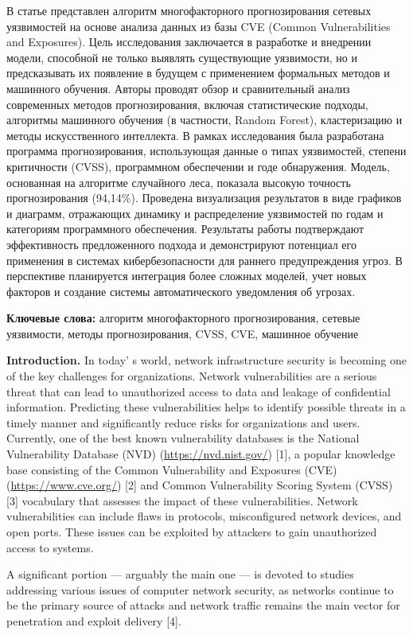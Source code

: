 В статье представлен алгоритм многофакторного прогнозирования сетевых
уязвимостей на основе анализа данных из базы CVE (Common Vulnerabilities
and Exposures). Цель исследования заключается в разработке и внедрении
модели, способной не только выявлять существующие уязвимости, но и
предсказывать их появление в будущем с применением формальных методов и
машинного обучения. Авторы проводят обзор и сравнительный анализ
современных методов прогнозирования, включая статистические подходы,
алгоритмы машинного обучения (в частности, Random Forest), кластеризацию
и методы искусственного интеллекта. В рамках исследования была
разработана программа прогнозирования, использующая данные о типах
уязвимостей, степени критичности (CVSS), программном обеспечении и годе
обнаружения. Модель, основанная на алгоритме случайного леса, показала
высокую точность прогнозирования (94,14\%). Проведена визуализация
результатов в виде графиков и диаграмм, отражающих динамику и
распределение уязвимостей по годам и категориям программного
обеспечения. Результаты работы подтверждают эффективность предложенного
подхода и демонстрируют потенциал его применения в системах
кибербезопасности для раннего предупреждения угроз. В перспективе
планируется интеграция более сложных моделей, учет новых факторов и
создание системы автоматического уведомления об угрозах.

{\bfseries Ключевые слова:} алгоритм многофакторного прогнозирования,
сетевые уязвимости, методы прогнозирования, CVSS, CVE, машинное обучение

{\bfseries Introduction.} In today' s world, network
infrastructure security is becoming one of the key challenges for
organizations. Network vulnerabilities are a serious threat that can
lead to unauthorized access to data and leakage of confidential
information. Predicting these vulnerabilities helps to identify possible
threats in a timely manner and significantly reduce risks for
organizations and users. Currently, one of the best known vulnerability
databases is the National Vulnerability Database (NVD)
(\url{https://nvd.nist.gov/}) {[}1{]}, a popular knowledge base
consisting of the Common Vulnerability and Exposures (CVE)
(\url{https://www.cve.org/}) {[}2{]} and Common Vulnerability Scoring
System (CVSS) {[}3{]} vocabulary that assesses the impact of these
vulnerabilities. Network vulnerabilities can include flaws in protocols,
misconfigured network devices, and open ports. These issues can be
exploited by attackers to gain unauthorized access to systems.

A significant portion --- arguably the main one --- is devoted to
studies addressing various issues of computer network security, as
networks continue to be the primary source of attacks and network
traffic remains the main vector for penetration and exploit delivery
{[}4{]}.

